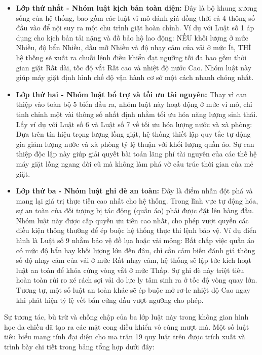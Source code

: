 \documentclass[12pt, a4paper]{article}
\begin{document}
\begin{itemize}
    \item \textbf{Lớp thứ nhất - Nhóm luật kịch bản toàn diện:} Đây là bộ khung xương sống của hệ thống, bao gồm các luật vĩ mô đánh giá đồng thời cả 4 thông số đầu vào để nội suy ra một chu trình giặt hoàn chỉnh. Ví dụ với Luật số 1 áp dụng cho kịch bản tải nặng và đồ bảo hộ lao động: NẾU khối lượng ở mức Nhiều, độ bẩn Nhiều, dầu mỡ Nhiều và độ nhạy cảm của vải ở mức Ít, THÌ hệ thống sẽ xuất ra chuỗi lệnh điều khiển đạt ngưỡng tối đa bao gồm thời gian giặt Rất dài, tốc độ vắt Rất cao và nhiệt độ nước Cao. Nhóm luật này giúp máy giặt định hình chế độ vận hành cơ sở một cách nhanh chóng nhất.
    
    \item \textbf{Lớp thứ hai - Nhóm luật bổ trợ và tối ưu tài nguyên:} Thay vì can thiệp vào toàn bộ 5 biến đầu ra, nhóm luật này hoạt động ở mức vi mô, chỉ tinh chỉnh một vài thông số nhất định nhằm tối ưu hóa năng lượng sinh thái. Lấy ví dụ với Luật số 6 và Luật số 7 về tối ưu hóa lượng nước và xà phòng: Dựa trên tín hiệu trọng lượng lồng giặt, hệ thống thiết lập quy tắc tự động gia giảm lượng nước và xà phòng tỷ lệ thuận với khối lượng quần áo. Sự can thiệp độc lập này giúp giải quyết bài toán lãng phí tài nguyên của các thế hệ máy giặt lồng ngang đời cũ mà không làm phá vỡ cấu trúc thời gian của mẻ giặt.
    
    \item \textbf{Lớp thứ ba - Nhóm luật ghi đè an toàn:} Đây là điểm nhấn đột phá và mang lại giá trị thực tiễn cao nhất cho hệ thống. Trong lĩnh vực tự động hóa, sự an toàn của đối tượng bị tác động (quần áo) phải được đặt lên hàng đầu. Nhóm luật này được cấp quyền ưu tiên cao nhất, cho phép vượt quyền các điều kiện thông thường để ép buộc hệ thống thực thi lệnh bảo vệ. Ví dụ điển hình là Luật số 9 nhằm bảo vệ đồ lụa hoặc vải mỏng: Bất chấp việc quần áo có mức độ bẩn hay khối lượng lớn đến đâu, chỉ cần cảm biến đánh giá thông số độ nhạy cảm của vải ở mức Rất nhạy cảm, hệ thống sẽ lập tức kích hoạt luật an toàn để khóa cứng vòng vắt ở mức Thấp. Sự ghi đè này triệt tiêu hoàn toàn rủi ro xé rách sợi vải do lực ly tâm sinh ra ở tốc độ vòng quay lớn. Tương tự, một số luật an toàn khác sẽ ép buộc mở rơ-le nhiệt độ Cao ngay khi phát hiện tỷ lệ vết bẩn cứng đầu vượt ngưỡng cho phép.
\end{itemize}

Sự tương tác, bù trừ và chồng chập của ba lớp luật này trong không gian hình học đa chiều đã tạo ra các mặt cong điều khiển vô cùng mượt mà. Một số luật tiêu biểu mang tính đại diện cho ma trận 19 quy luật trên được trích xuất và trình bày chi tiết trong bảng tổng hợp dưới đây:
\end{document}
